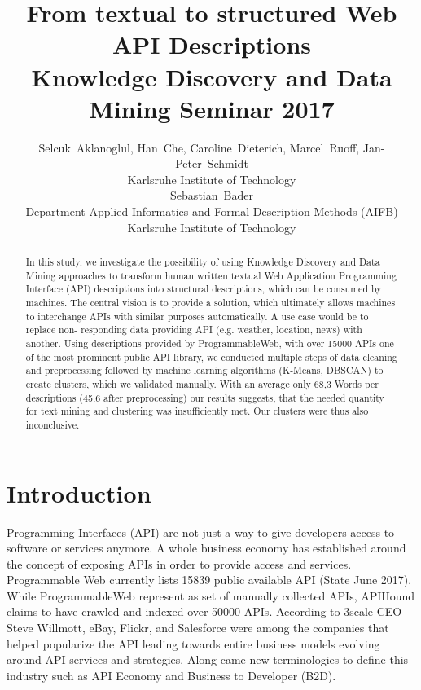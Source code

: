 \documentclass[a4paper]{IEEEtran}
\begin{document}
\title{From textual to structured Web API Descriptions\\ \large Knowledge Discovery and Data Mining Seminar 2017 }


\author{Selcuk~Aklanoglul,
        Han~Che,
        Caroline~Dieterich,
        Marcel~Ruoff,
        Jan-Peter~Schmidt  \\
Karlsruhe Institute of Technology \\
Sebastian~Bader \\
Department Applied Informatics and  Formal Description Methods (AIFB)  \\
Karlsruhe Institute of Technology

}



\maketitle

\begin{abstract}
In this study, we investigate the possibility of using Knowledge Discovery and Data Mining approaches to transform human written textual Web Application Programming Interface
(API) descriptions into structural descriptions, which
can be consumed by machines. The central vision
is to provide a solution, which ultimately allows
machines to interchange APIs with similar purposes
automatically. A use case would be to replace non-
responding data providing API (e.g. weather,
location, news) with another. Using descriptions
provided by ProgrammableWeb, with over 15000
APIs one of the most prominent public API library,
we conducted multiple steps of data cleaning and
preprocessing followed by machine learning
algorithms (K-Means, DBSCAN) to create clusters,
which we validated manually. With an average only
68,3 Words per descriptions (45,6 after
preprocessing) our results suggests, that the
needed quantity for text mining and clustering was insufficiently met. Our clusters were thus also
inconclusive.
\end{abstract}


\IEEEpeerreviewmaketitle

\section{Introduction}
 Programming Interfaces (API) are not just a way to give developers access to software or services anymore. A whole business economy has established around the concept of exposing APIs in order to provide access and services. Programmable Web currently lists 15839 public available API (State June 2017). While ProgrammableWeb represent as set of manually collected APIs, APIHound claims to have crawled and indexed over 50000 APIs.
According to 3scale CEO Steve Willmott, eBay, Flickr, and Salesforce were among the companies that helped popularize the API \cite{tmcnet} leading towards entire business models evolving around API services and strategies. Along came new terminologies to define this industry such as API Economy and Business to Developer (B2D).
\end{document}
